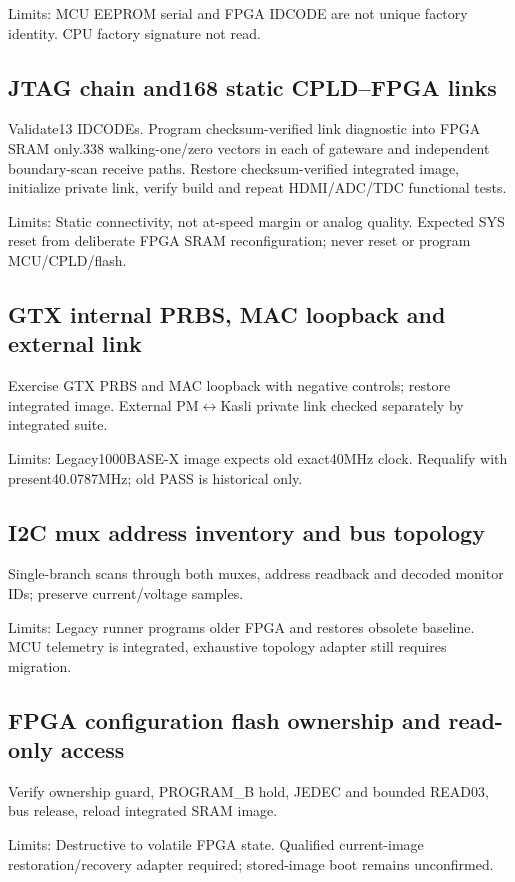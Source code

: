 Limits: MCU EEPROM serial and FPGA IDCODE are not unique factory identity. CPU factory signature not read.

\subsection{JTAG chain and168 static CPLD--FPGA links}
Validate13 IDCODEs. Program checksum-verified link diagnostic into FPGA SRAM only.338 walking-one/zero vectors in each of gateware and independent boundary-scan receive paths. Restore checksum-verified integrated image, initialize private link, verify build and repeat HDMI/ADC/TDC functional tests.

Limits: Static connectivity, not at-speed margin or analog quality. Expected SYS reset from deliberate FPGA SRAM reconfiguration; never reset or program MCU/CPLD/flash.

\subsection{GTX internal PRBS, MAC loopback and external link}
Exercise GTX PRBS and MAC loopback with negative controls; restore integrated image. External PM$\leftrightarrow$Kasli private link checked separately by integrated suite.

Limits: Legacy1000BASE-X image expects old exact40MHz clock. Requalify with present40.0787MHz; old PASS is historical only.

\subsection{I2C mux address inventory and bus topology}
Single-branch scans through both muxes, address readback and decoded monitor IDs; preserve current/voltage samples.

Limits: Legacy runner programs older FPGA and restores obsolete baseline. MCU telemetry is integrated, exhaustive topology adapter still requires migration.

\subsection{FPGA configuration flash ownership and read-only access}
Verify ownership guard, PROGRAM\_B hold, JEDEC and bounded READ03, bus release, reload integrated SRAM image.

Limits: Destructive to volatile FPGA state. Qualified current-image restoration/recovery adapter required; stored-image boot remains unconfirmed.

